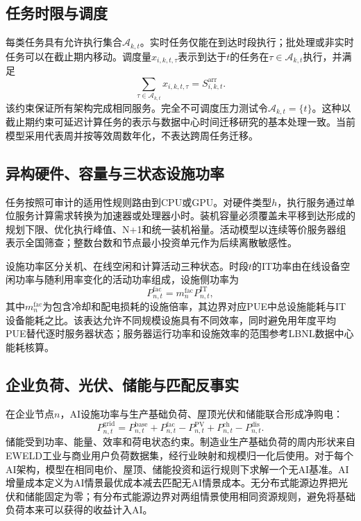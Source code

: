 \documentclass[preprint,12pt]{elsarticle}
\begin{document}
\subsection*{任务时限与调度}

每类任务具有允许执行集合$\mathcal{A}_{k,t}$。实时任务仅能在到达时段执行；批处理或非实时任务可以在截止期内移动。调度量$x_{i,k,t,\tau}$表示到达于$t$的任务在$\tau\in\mathcal{A}_{k,t}$执行，并满足
\begin{equation}
\sum_{\tau\in\mathcal{A}_{k,t}}x_{i,k,t,\tau}=S^{\mathrm{arr}}_{i,k,t}.
\end{equation}
该约束保证所有架构完成相同服务。完全不可调度压力测试令$\mathcal{A}_{k,t}=\{t\}$。这种以截止期约束可延迟计算任务的表示与数据中心时间迁移研究的基本处理一致\citep{Radovanovic2022CarbonAwareComputing}。当前模型采用代表周并按等效周数年化，不表达跨周任务迁移。

\subsection*{异构硬件、容量与三状态设施功率}

任务按照可审计的适用性规则路由到CPU或GPU。对硬件类型$h$，执行服务通过单位服务计算需求转换为加速器或处理器小时。装机容量必须覆盖未平移到达形成的规划下限、优化执行峰值、N+1和统一装机裕量。活动模型以连续等价服务器组表示全国筛查；整数台数和节点最小投资单元作为后续离散敏感性。

设施功率区分关机、在线空闲和计算活动三种状态。时段$t$的IT功率由在线设备空闲功率与随利用率变化的活动功率组成，设施侧功率为
\begin{equation}
P^{\mathrm{fac}}_{n,t}=m^{\mathrm{fac}}_n P^{\mathrm{IT}}_{n,t},
\end{equation}
其中$m^{\mathrm{fac}}_n$为包含冷却和配电损耗的设施倍率，其边界对应PUE中总设施能耗与IT设备能耗之比\citep{DOE2024DataCenterDesign}。该表达允许不同规模设施具有不同效率，同时避免用年度平均PUE替代逐时服务器状态；服务器运行功率和设施效率的范围参考LBNL数据中心能耗核算\citep{Shehabi2024DataCenterEnergy}。

\subsection*{企业负荷、光伏、储能与匹配反事实}

在企业节点$n$，AI设施功率与生产基础负荷、屋顶光伏和储能联合形成净购电：
\begin{equation}
P^{\mathrm{grid}}_{n,t}=P^{\mathrm{base}}_{n,t}+P^{\mathrm{fac}}_{n,t}
-P^{\mathrm{PV}}_{n,t}+P^{\mathrm{ch}}_{n,t}-P^{\mathrm{dis}}_{n,t}.
\end{equation}
储能受到功率、能量、效率和荷电状态约束。制造业生产基础负荷的周内形状来自EWELD工业与商业用户负荷数据集，经行业映射和规模归一化后使用\citep{Liu2023EWELD}。对于每个AI架构，模型在相同电价、屋顶、储能投资和运行规则下求解一个无AI基准。AI增量成本定义为AI情景最优成本减去匹配无AI情景成本。无分布式能源边界把光伏和储能固定为零；有分布式能源边界对两组情景使用相同资源规则，避免将基础负荷本来可以获得的收益计入AI。
\end{document}
